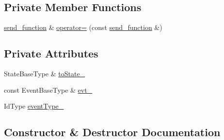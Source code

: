 \subsection*{Private Member Functions}
\begin{DoxyCompactItemize}
\item 
\mbox{\hyperlink{classboost_1_1statechart_1_1detail_1_1send__function}{send\+\_\+function}} \& \mbox{\hyperlink{classboost_1_1statechart_1_1detail_1_1send__function_a70373b8c5f8828b48f9284b23ae8ccae}{operator=}} (const \mbox{\hyperlink{classboost_1_1statechart_1_1detail_1_1send__function}{send\+\_\+function}} \&)
\end{DoxyCompactItemize}
\subsection*{Private Attributes}
\begin{DoxyCompactItemize}
\item 
State\+Base\+Type \& \mbox{\hyperlink{classboost_1_1statechart_1_1detail_1_1send__function_af41e78b5674d4606b96203c9e888f6f2}{to\+State\+\_\+}}
\item 
const Event\+Base\+Type \& \mbox{\hyperlink{classboost_1_1statechart_1_1detail_1_1send__function_a6d0b8117e992582ce82847c71120af7d}{evt\+\_\+}}
\item 
Id\+Type \mbox{\hyperlink{classboost_1_1statechart_1_1detail_1_1send__function_a7d5fc4bb3b0bfeb1486ab83bd1617f0a}{event\+Type\+\_\+}}
\end{DoxyCompactItemize}


\subsection{Constructor \& Destructor Documentation}
\mbox{\label{classboost_1_1statechart_1_1detail_1_1send__function_a9fb0b72962c94b35cf4757ab111e6c88}} 
